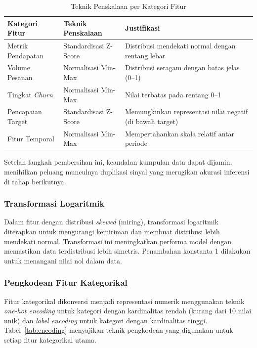 \begin{table}[htbp]
\centering
\caption{Teknik Penskalaan per Kategori Fitur}
\label{tab:teknik-scaling}
\begin{tabular}{|p{3.5cm}|p{3.5cm}|p{5cm}|}
\hline
\textbf{Kategori Fitur} & \textbf{Teknik Penskalaan} & \textbf{Justifikasi} \\
\hline
Metrik Pendapatan & Standardisasi Z-Score & Distribusi mendekati normal dengan rentang lebar \\
\hline
Volume Pesanan & Normalisasi Min-Max & Distribusi seragam dengan batas jelas (0--1) \\
\hline
Tingkat \textit{Churn} & Normalisasi Min-Max & Nilai terbatas pada rentang 0--1 \\
\hline
Pencapaian Target & Standardisasi Z-Score & Memungkinkan representasi nilai negatif (di bawah target) \\
\hline
Fitur Temporal & Normalisasi Min-Max & Mempertahankan skala relatif antar periode \\
\hline
\end{tabular}
\end{table}

Setelah langkah pembersihan ini, keandalan kumpulan data dapat dijamin, menihilkan peluang munculnya duplikasi sinyal yang merugikan akurasi inferensi di tahap berikutnya.

\subsubsection{Transformasi Logaritmik}

Dalam fitur dengan distribusi \textit{skewed} (miring), transformasi logaritmik diterapkan untuk mengurangi kemiriman dan membuat distribusi lebih mendekati normal. Transformasi ini meningkatkan performa model dengan memastikan data terdistribusi lebih simetris. Penambahan konstanta 1 dilakukan untuk menangani nilai nol dalam data.

\subsubsection{Pengkodean Fitur Kategorikal}

Fitur kategorikal dikonversi menjadi representasi numerik menggunakan teknik \textit{one-hot encoding} untuk kategori dengan kardinalitas rendah (kurang dari 10 nilai unik) dan \textit{label encoding} untuk kategori dengan kardinalitas tinggi. Tabel~\ref{tab:encoding} menyajikan teknik pengkodean yang digunakan untuk setiap fitur kategorikal utama.

